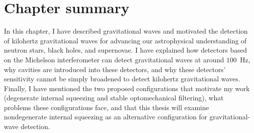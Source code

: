 


\section{Chapter summary}


In this chapter, I have described gravitational waves and motivated the detection of kilohertz gravitational waves for advancing our astrophysical understanding of neutron stars, black holes, and supernovae. I have explained how detectors based on the Michelson interferometer can detect gravitational waves at around $100$~Hz, why cavities are introduced into these detectors, and why these detectors' sensitivity cannot be simply broadened to detect kilohertz gravitational waves. Finally, I have mentioned the two proposed configurations that motivate my work (degenerate internal squeezing and stable optomechanical filtering), what problems these configurations face, and that this thesis will examine nondegenerate internal squeezing as an alternative configuration for gravitational-wave detection.


